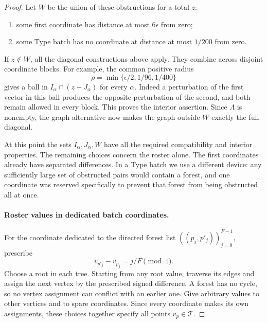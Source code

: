\begin{proof}
Let $W$ be the union of these obstructions for a total $z$:
\begin{enumerate}[label=\textup{(\alph*)}]
\item some first coordinate has distance at most $6\epsilon$ from zero;
\item some Type batch has no coordinate at distance at most $1/200$
from zero.
\end{enumerate}
If $z\notin W$, all the diagonal constructions above apply. They
combine across disjoint coordinate blocks. For example, the common
positive radius
\begin{equation}\label{clock:interior-radius}
                  \rho=\min\{\epsilon/2,1/96,1/400\}
\end{equation}
gives a ball in $I_\alpha\cap(z-J_\alpha)$ for every $\alpha$.
Indeed a perturbation of the first vector in this ball produces the
opposite perturbation of the second, and both remain allowed in every
block. This proves the interior assertion. Since $\Lambda$ is nonempty,
the graph alternative now makes the graph outside $W$ exactly the
full diagonal.

At this point the sets $I_\alpha,J_\alpha,W$ have all the required
compatibility and interior properties. The remaining choices concern the
roster alone. The first coordinates already have separated differences.
In a Type batch we use a different device: any sufficiently large set of
obstructed pairs would contain a forest, and one coordinate was reserved
specifically to prevent that forest from being obstructed all at once.

\paragraph{Roster values in dedicated batch coordinates.}
For the coordinate dedicated to the directed forest list
$((p_j,p'_j))_{j=0}^{F-1}$, prescribe
\begin{equation}\label{clock:forest-values}
                         v_{p'_j}-v_{p_j}=j/F\pmod1.
\end{equation}
Choose a root in each tree. Starting from any root value, traverse its
edges and assign the next vertex by the prescribed signed difference.
A forest has no cycle, so no vertex assignment can conflict with an
earlier one. Give arbitrary values to other vertices and to spare
coordinates. Since every coordinate makes its own assignments, these
choices together specify all points $v_p\in\mathcal T$.


\end{proof}
